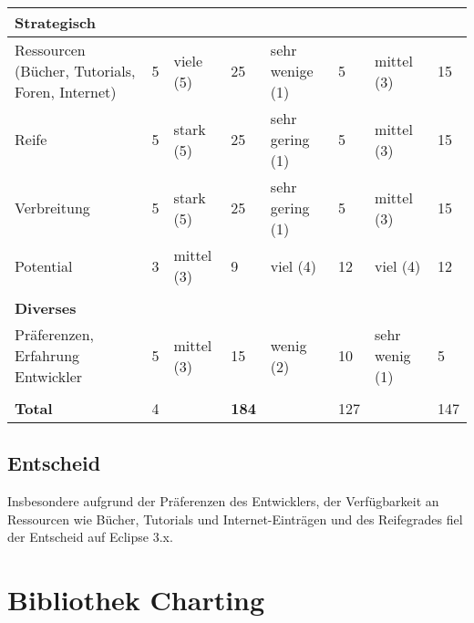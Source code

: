 \begin{longtable}{|p{2.8cm}|p{0.7cm}|p{2.1cm}|p{0.7cm}|p{2.1cm}|p{0.7cm}|p{2.2cm}|p{0.7cm}|}
\multicolumn{8}{|l|}{\textbf{Strategisch}}\\\hline
  Ressourcen (Bücher, Tutorials, Foren, Internet) & 5 & viele (5) & 25 & sehr wenige (1) &5&mittel (3)&15 \\\hline
  Reife & 5 & stark (5) & 25 & sehr gering (1) &5&mittel (3)&15 \\\hline
  Verbreitung & 5 & stark (5) & 25 & sehr gering (1) &5&mittel (3)&15 \\\hline
  Potential & 3 & mittel (3) & 9 & viel (4)  & 12 & viel (4)&12 \\\hline
 \multicolumn{8}{|l|}{}\\
\multicolumn{8}{|l|}{\textbf{Diverses}}\\\hline
  Präferenzen, Erfahrung Entwickler & 5 & mittel (3) & 15 & wenig (2) &10&sehr wenig (1)&5 \\\hline
 \multicolumn{8}{|l|}{}\\\hline 
 \textbf{Total} & 4 & &\textbf{184}&&127& & 147 \\\hline
\end{longtable}


\subsection{Entscheid}\label{rcp_entscheid}
Insbesondere aufgrund der Präferenzen des Entwicklers, der Verfügbarkeit an Ressourcen wie Bücher, Tutorials und Internet-Einträgen und des Reifegrades fiel der Entscheid auf Eclipse 3.x. 


\section{Bibliothek Charting}\label{library_charting}



